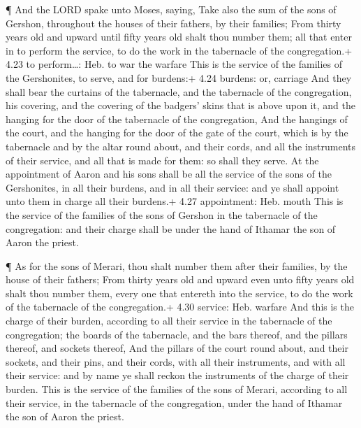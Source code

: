  ¶ And the LORD spake unto Moses, saying, 
Take also the sum of the sons of Gershon, throughout the houses of their
fathers, by their families;  From thirty years old and
upward until fifty years old shalt thou number them; all that enter in
to perform the service, to do the work in the tabernacle of the
congregation.+ 4.23 to perform\ldots: Heb. to war the warfare
 This is the service of the families of the Gershonites, to
serve, and for burdens:+ 4.24 burdens: or, carriage  And
they shall bear the curtains of the tabernacle, and the tabernacle of
the congregation, his covering, and the covering of the badgers' skins
that is above upon it, and the hanging for the door of the tabernacle of
the congregation,  And the hangings of the court, and the
hanging for the door of the gate of the court, which is by the
tabernacle and by the altar round about, and their cords, and all the
instruments of their service, and all that is made for them: so shall
they serve.  At the appointment of Aaron and his sons shall
be all the service of the sons of the Gershonites, in all their burdens,
and in all their service: and ye shall appoint unto them in charge all
their burdens.+ 4.27 appointment: Heb. mouth  This is the
service of the families of the sons of Gershon in the tabernacle of the
congregation: and their charge shall be under the hand of Ithamar the
son of Aaron the priest.

 ¶ As for the sons of Merari, thou shalt number them after
their families, by the house of their fathers;  From thirty
years old and upward even unto fifty years old shalt thou number them,
every one that entereth into the service, to do the work of the
tabernacle of the congregation.+ 4.30 service: Heb. warfare
 And this is the charge of their burden, according to all
their service in the tabernacle of the congregation; the boards of the
tabernacle, and the bars thereof, and the pillars thereof, and sockets
thereof,  And the pillars of the court round about, and
their sockets, and their pins, and their cords, with all their
instruments, and with all their service: and by name ye shall reckon the
instruments of the charge of their burden.  This is the
service of the families of the sons of Merari, according to all their
service, in the tabernacle of the congregation, under the hand of
Ithamar the son of Aaron the priest.

